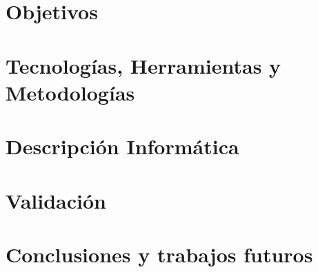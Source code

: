 \documentclass[12pt,twoside,titlepage]{report}
\newcommand\blankpage{%
    \newpage
    \null
    \thispagestyle{empty}%
    \newpage}
\begin{document}


\chapter{Objetivos}
\label{sec:objetivos}



\chapter{Tecnologías, Herramientas y Metodologías}
\label{sec:tecnologias}



\chapter{Descripción Informática}
\label{sec:descripcionInformatica}



\chapter{Validación}
\label{sec:validacion}




\chapter{Conclusiones y trabajos futuros}
\label{sec:conclusiones}



\blankpage



{}

\footnotesize{
%


}



\raggedbottom
\newpage


\appendix
\end{document}
